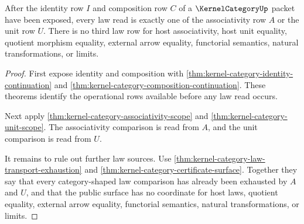 \begin{theorem}
\label{thm:kernel-category-law-row-exactness}
After the identity row $I$ and composition row $C$ of a $\KernelCategoryUp$ packet have been exposed, every law read is exactly one of the associativity row $A$ or the unit row $U$. There is no third law row for host associativity, host unit equality, quotient morphism equality, external arrow equality, functorial semantics, natural transformations, or limits.
\end{theorem}
\begin{proof}
First expose identity and composition with \autoref{thm:kernel-category-identity-continuation} and \autoref{thm:kernel-category-composition-continuation}. These theorems identify the operational rows available before any law read occurs.

Next apply \autoref{thm:kernel-category-associativity-scope} and \autoref{thm:kernel-category-unit-scope}. The associativity comparison is read from $A$, and the unit comparison is read from $U$.

It remains to rule out further law sources. Use \autoref{thm:kernel-category-law-transport-exhaustion} and \autoref{thm:kernel-category-certificate-surface}. Together they say that every category-shaped law comparison has already been exhausted by $A$ and $U$, and that the public surface has no coordinate for host laws, quotient equality, external arrow equality, functorial semantics, natural transformations, or limits.
\end{proof}

